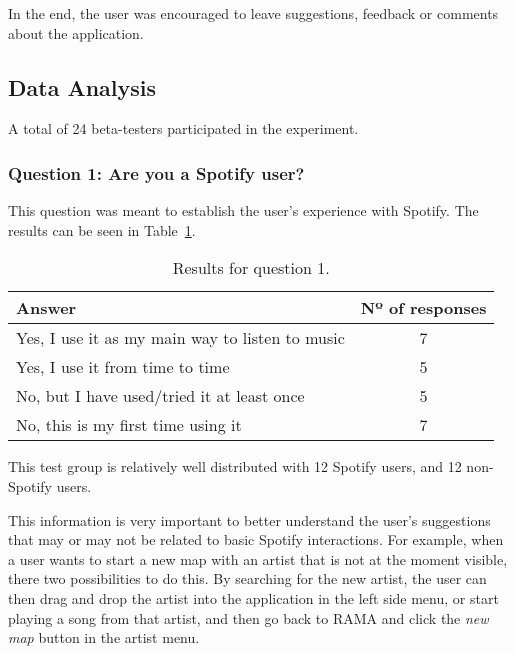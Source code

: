     In the end, the user was encouraged to leave suggestions, feedback or comments about the application.


  \subsection{Data Analysis} %
  \label{sub:data_analysis}

    A total of 24 beta-testers participated in the experiment.

    \subsubsection{Question 1: Are you a Spotify user?} %
    \label{ssub:question_1}

      This question was meant to establish the user's experience with Spotify.
      The results can be seen in Table~\ref{tab:question1}.

      \begin{table}[H] %
         \begin{center}
           \begin{tabular}{l|c}
       
           \hline
           \textbf{Answer} & \textbf{Nº of responses} \\
           \hline

           \hline
              Yes, I use it as my main way to listen to music & 7 \\
              Yes, I use it from time to time & 5 \\
              No, but I have used/tried it at least once & 5 \\
              No, this is my first time using it & 7 \\
           \hline
           \end{tabular}
         \end{center}
         \caption{Results for question 1.}
         \label{tab:question1}
       \end{table}

      This test group is relatively well distributed with 12 Spotify users, and 12 non-Spotify users.

      This information is very important to better understand the user's suggestions that may or may not be related to basic Spotify interactions.
      For example, when a user wants to start a new map with an artist that is not at the moment visible, there two possibilities to do this.
      By searching for the new artist, the user can then drag and drop the artist into the application in the left side menu, or start playing a song from that artist, and then go back to RAMA and click the \emph{new map} button in the artist menu.

